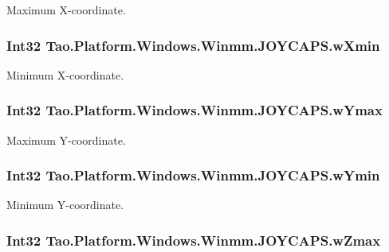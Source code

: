 Maximum X-\/coordinate. 

\hypertarget{struct_tao_1_1_platform_1_1_windows_1_1_winmm_1_1_j_o_y_c_a_p_s_aadb1241381b0471dbe792fe06e4df58c}{
\subsubsection[{wXmin}]{\setlength{\rightskip}{0pt plus 5cm}Int32 {\bf Tao.Platform.Windows.Winmm.JOYCAPS.wXmin}}}
\label{struct_tao_1_1_platform_1_1_windows_1_1_winmm_1_1_j_o_y_c_a_p_s_aadb1241381b0471dbe792fe06e4df58c}


Minimum X-\/coordinate. 

\hypertarget{struct_tao_1_1_platform_1_1_windows_1_1_winmm_1_1_j_o_y_c_a_p_s_ae8505261b876eca98bffcaa9dd4759ff}{
\subsubsection[{wYmax}]{\setlength{\rightskip}{0pt plus 5cm}Int32 {\bf Tao.Platform.Windows.Winmm.JOYCAPS.wYmax}}}
\label{struct_tao_1_1_platform_1_1_windows_1_1_winmm_1_1_j_o_y_c_a_p_s_ae8505261b876eca98bffcaa9dd4759ff}


Maximum Y-\/coordinate. 

\hypertarget{struct_tao_1_1_platform_1_1_windows_1_1_winmm_1_1_j_o_y_c_a_p_s_a88fc091348eab2c1f4c6a95dc67f816a}{
\subsubsection[{wYmin}]{\setlength{\rightskip}{0pt plus 5cm}Int32 {\bf Tao.Platform.Windows.Winmm.JOYCAPS.wYmin}}}
\label{struct_tao_1_1_platform_1_1_windows_1_1_winmm_1_1_j_o_y_c_a_p_s_a88fc091348eab2c1f4c6a95dc67f816a}


Minimum Y-\/coordinate. 

\hypertarget{struct_tao_1_1_platform_1_1_windows_1_1_winmm_1_1_j_o_y_c_a_p_s_ab3f82bb6e8fa918550bf349c30218ecc}{
\subsubsection[{wZmax}]{\setlength{\rightskip}{0pt plus 5cm}Int32 {\bf Tao.Platform.Windows.Winmm.JOYCAPS.wZmax}}}
\label{struct_tao_1_1_platform_1_1_windows_1_1_winmm_1_1_j_o_y_c_a_p_s_ab3f82bb6e8fa918550bf349c30218ecc}


